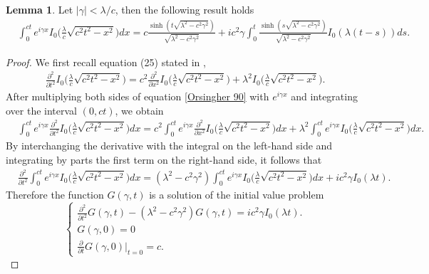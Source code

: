 \documentclass{article}
\theoremstyle{definition}
\newtheorem{lemma}{Lemma}[section]
\numberwithin{equation}{section}
\begin{document}
\begin{lemma}\label{Lemma}
Let $|\gamma| <\lambda/c$, then the following result holds
\begin{align}\label{formula Lemma}
&\int_0^{ct}e^{i\gamma x}I_0\big(\frac{\lambda}{c}\sqrt{c^2t^2-x^2}\big)dx = c\frac{\sinh{(t\sqrt{\lambda^2-c^2\gamma^2})}}{\sqrt{\lambda^2-c^2\gamma^2}} + i c^2\gamma\int_0^t\frac{\sinh{(s\sqrt{\lambda^2-c^2\gamma^2})}}{\sqrt{\lambda^2-c^2\gamma^2}}I_0(\lambda (t-s))ds.
\end{align}
\begin{proof}
We first recall equation (25) stated in \cite{O 1990},
\begin{align}\label{Orsingher 90}
\frac{\partial^2}{\partial t^2}I_0\big(\frac{\lambda}{c}\sqrt{c^2t^2-x^2}\big) = c^2\frac{\partial^2}{\partial x^2}I_0\big(\frac{\lambda}{c}\sqrt{c^2t^2-x^2}\big)+ \lambda^2 I_0\big(\frac{\lambda}{c}\sqrt{c^2t^2-x^2}\big).
\end{align}
After multiplying both sides of equation \eqref{Orsingher 90} with $e^{i\gamma x}$ and integrating over the interval $(0,ct)$, we obtain
\begin{align*}
&\int_{0}^{ct}e^{i\gamma x}\frac{\partial^2}{\partial t^2}I_0\big(\frac{\lambda}{c}\sqrt{c^2t^2-x^2}\big)dx =c^2\int_{0}^{ct}e^{i\gamma x}\frac{\partial^2}{\partial x^2}I_0\big(\frac{\lambda}{c}\sqrt{c^2t^2-x^2}\big)dx+ \lambda^2 \int_{0}^{ct}e^{i\gamma x}I_0\big(\frac{\lambda}{c}\sqrt{c^2t^2-x^2}\big)dx.
\end{align*}
By interchanging the derivative with the integral on the left-hand side and integrating by parts the first term on the right-hand side, it follows that
\begin{align*}
&\frac{\partial^2}{\partial t^2}\int_{0}^{ct}e^{i\gamma x}I_0\big(\frac{\lambda}{c}\sqrt{c^2t^2-x^2}\big)dx =(\lambda^2-c^2\gamma^2)\int_{0}^{ct}e^{i\gamma x}I_0\big(\frac{\lambda}{c}\sqrt{c^2t^2-x^2}\big)dx + i c^2\gamma I_0(\lambda t).
\end{align*}
Therefore the function $G(\gamma,t)$ is a solution of the initial value problem
\begin{equation}\label{Cauchy problem}
\begin{cases}
\frac{\partial^2}{\partial t^2}G(\gamma,t) -(\lambda^2-c^2\gamma^2)G(\gamma,t) = ic^2\gamma I_0(\lambda t).  \\
G(\gamma,0) = 0 \\
\frac{\partial}{\partial t} G(\gamma,0)|_{t=0} = c.
\end{cases}
\end{equation}

\end{proof}
\end{lemma}
\end{document}

